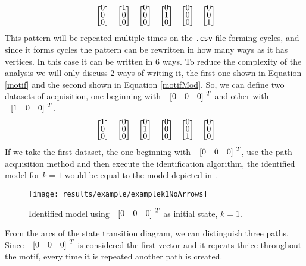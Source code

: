\begin{align}
  \label{motif}
\colvec{0\\0\\0}\colvec{1\\0\\0}\colvec{0\\0\\0}\colvec{0\\1\\0}\colvec{0\\0\\0}\colvec{0\\0\\1}
\end{align}
This pattern will be repeated multiple times on the \verb|.csv| file forming
cycles, and since it forms cycles the pattern can be rewritten in how many ways as
it has vertices. In this case it can be written in 6 ways. To reduce the
complexity of the analysis we will only discuss 2 ways of writing it, the first
one shown in Equation
\ref{motif} and the second shown in Equation \ref{motifMod}. So, we can define two datasets of acquisition,
one beginning with $\colvec{0&0&0}^T$ and other with $\colvec{1&0&0}^T$.
\begin{align}
  \label{motifMod}
\colvec{1\\0\\0}\colvec{0\\0\\0}\colvec{0\\1\\0}\colvec{0\\0\\0}\colvec{0\\0\\1}\colvec{0\\0\\0}
\end{align}
If we take the first dataset, the one beginning with $\colvec{0&0&0}^T$, use the
path acquisition method and then
execute the identification algorithm, the identified model for $k=1$ would be
equal to the model depicted in . 
\begin{figure}[H]
  \centering
 \texttt{[image: results/example/examplek1NoArrows]}
  \caption{Identified model using $\colvec{0&0&0}^T$ as initial state, $k=1$.}
    \label{fig:exampleCol000k1}
\end{figure}
From the arcs of the state transition diagram, we can distinguish three paths. Since
$\colvec{0&0&0}^T$ is considered the first vector and it repeats thrice
throughout the motif, every time it is repeated another path is created.

